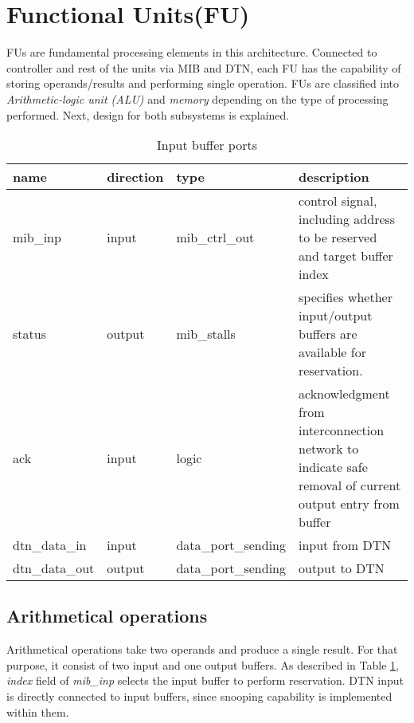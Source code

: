 \section{Functional Units(FU)}
	FUs are fundamental processing elements in this architecture. Connected to controller and rest of the units via MIB and DTN, each FU has the capability of storing operands/results and performing single operation. FUs are classified into \textit{Arithmetic-logic unit (ALU)} and \textit{memory} depending on the type of processing performed. Next, design for both subsystems is explained.
	
	\begin{table}
		\begin{tabular}{| l| l | l | p{8cm} |}
			\hline
			\textbf{name} & \textbf{direction} & \textbf{type} &  \textbf{description}\\ \hline
			mib\_inp & input & mib\_ctrl\_out & control signal, including address to be reserved and target buffer index \\ \hline
			status & output & mib\_stalls & specifies whether input/output buffers are available for reservation. \\ \hline
			ack & input & logic & acknowledgment from interconnection network to indicate safe removal of current output entry from buffer \\ \hline
			dtn\_data\_in & input & data\_port\_sending & input from DTN \\ \hline
			dtn\_data\_out & output & data\_port\_sending & output to DTN \\ \hline
		\end{tabular}
		
		\caption{Input buffer ports \label{table:fu_alu_description}}
		\centering
	\end{table}
	\subsection{Arithmetical operations}
	Arithmetical operations take two operands and produce a single result. For that purpose, it consist of two input and one output buffers. As described in Table \ref{table:fu_alu_description}, \textit{index} field of \textit{mib\_inp} selects the input buffer to perform reservation. DTN input is directly connected to input buffers, since snooping capability is implemented within them.
	
